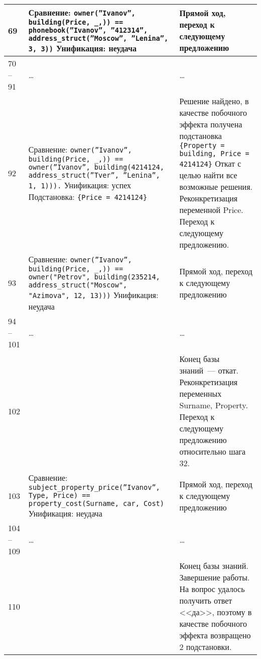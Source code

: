 \begin{xltabular}{\textwidth}{|l|X|Y|}
		69 &
		Сравнение:\newline
		\texttt{owner(''Ivanov'', building(Price, \_,)) == phonebook(''Ivanov'', ''412314'', address\_struct(''Moscow'', ''Lenina'', 3, 3))} \newline\newline
		Унификация: неудача &
		Прямой ход, переход к следующему предложению \\ \hline

		70 -- 91 & \centering \dots & \dots \\ \hline

		92 &
		Сравнение:\newline
		\texttt{owner(''Ivanov'', building(Price, \_,)) == owner(''Ivanov'', building(4214124, address\_struct(''Tver'', ''Lenina'', 1, 1))).} \newline\newline
		Унификация: успех \newline\newline
		Подстановка: \texttt{\{Price = 4214124\}} & 
		Решение найдено, в качестве побочного эффекта получена подстановка \texttt{\{Property = building, Price = 4214124\}} \newline\newline 
		Откат с целью найти все возможные решения.
		Реконкретизация переменной Price.
		Переход к следующему предложению.\\ \hline

		93 &
		Сравнение:\newline
		\texttt{owner(''Ivanov'', building(Price, \_,)) == owner("Petrov", building(235214, address\_struct("Moscow", "Azimova", 12, 13)))} \newline\newline
		Унификация: неудача &
		Прямой ход, переход к следующему предложению \\ \hline

		94 -- 101 & \centering \dots & \dots \\ \hline

		102 &
		 &
		Конец базы знаний~--- откат.
		Реконкретизация переменных Surname, Property.
		Переход к следующему предложению относительно шага 32.\\ \hline

		103 &
		Сравнение:\newline
		\texttt{subject\_property\_price(''Ivanov'', Type, Price) == property\_cost(Surname, car, Cost)} \newline\newline
		Унификация: неудача &
		Прямой ход, переход к следующему предложению \\ \hline

		104 -- 109 & \centering \dots & \dots \\ \hline

		110 &
		&
		Конец базы знаний.
		Завершение работы. \newline\newline
		На вопрос удалось получить ответ <<да>>, поэтому в качестве побочного эффекта возвращено 2 подстановки.
		\\ \hline
	\end{xltabular}